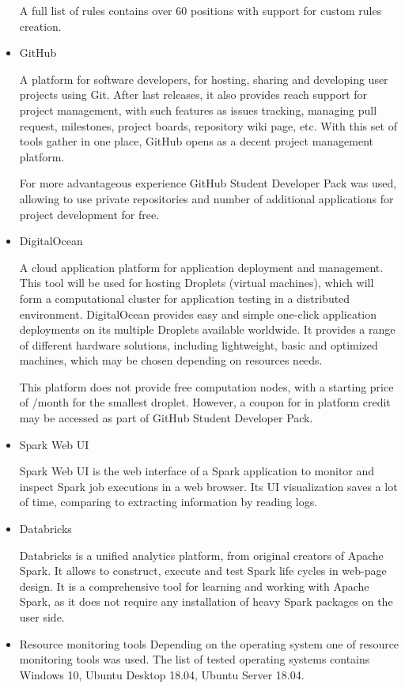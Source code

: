 \begin{itemize}
A full list of rules contains over 60 positions with support for custom rules creation.
\smallskip

\item GitHub

A platform for software developers, for hosting, sharing and developing user projects using Git. After last releases, it also provides reach support for project management, with such features as issues tracking, managing pull request, milestones, project boards, repository wiki page, etc. With this set of tools gather in one place, GitHub opens as a decent project management platform.

For more advantageous experience GitHub Student Developer Pack was used, allowing to use private repositories and number of additional applications for project development for free.
\smallskip

\item DigitalOcean

A cloud application platform for application deployment and management. This tool will be used for hosting Droplets (virtual machines), which will form a computational cluster for application testing in a distributed environment. DigitalOcean provides easy and simple one-click application deployments on its multiple Droplets available worldwide. It provides a range of different hardware solutions, including lightweight, basic and optimized machines, which may be chosen depending on resources needs.

This platform does not provide free computation nodes, with a starting price of /month for the smallest droplet. However, a coupon for  in platform credit may be accessed as part of GitHub Student Developer Pack.
\smallskip

\item Spark Web UI

Spark Web UI is the web interface of a Spark application to monitor and inspect Spark job executions in a web browser. Its UI visualization saves a lot of time, comparing to extracting information by reading logs.
\smallskip

\item Databricks

Databricks is a unified analytics platform, from original creators of Apache Spark. It allows to construct, execute and test Spark life cycles in web-page design. It is a comprehensive tool for learning and working with Apache Spark, as it does not require any installation of heavy Spark packages on the user side.
\smallskip

\item Resource monitoring tools
Depending on the operating system one of resource monitoring tools was used. The list of tested operating systems contains Windows 10, Ubuntu Desktop 18.04, Ubuntu Server 18.04.
\smallskip 
\end{itemize}


